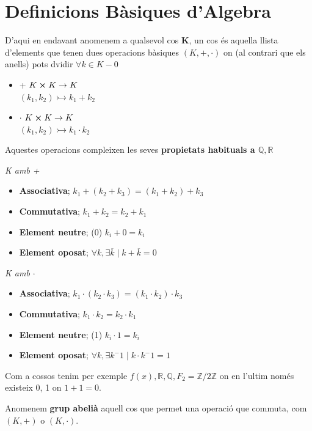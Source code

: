 \documentclass[12pt]{article}
\newcommand{\R}{\mathbb{R}}
\newcommand{\Q}{\mathbb{Q}}
\newcommand{\Z}{\mathbb{Z}}
\begin{document}
\tableofcontents

\newpage

\section{Definicions Bàsiques d'Algebra}

D'aqui en endavant anomenem a qualsevol cos \textbf{K}, un cos és aquella llista d'elements que tenen dues operacions bàsiques $(K, +, \cdot)$ on (al contrari que els anells) pots dvidir $\forall k \in K - 0$

\begin{itemize}
    \item + $K \cross K \rightarrow K$\\
    $(k_1, k_2) \rightarrowtail k_1 + k_2$
    \item $\cdot$ $K \cross K \rightarrow K$\\
    $(k_1, k_2) \rightarrowtail k_1 \cdot k_2$ 
\end{itemize}

Aquestes operacions compleixen les seves \textbf{propietats habituals a $\Q, \R$}

\textit{K amb +}
\begin{itemize}
    \item \textbf{Associativa}; $k_1 +(k_2 + k_3) = (k_1 + k_2) + k_3$
    \item \textbf{Commutativa}; $k_1 + k_2 = k_2 + k_1$
    \item \textbf{Element neutre}; (0) $k_i + 0 = k_i$
    \item \textbf{Element oposat}; $\forall k, \exists \overline{k} \mid k + \overline{k} = 0$
\end{itemize}

\textit{K amb $\cdot$}
\begin{itemize}
    \item \textbf{Associativa}; $k_1 \cdot(k_2 \cdot k_3) = (k_1 \cdot k_2) \cdot k_3$
    \item \textbf{Commutativa}; $k_1 \cdot k_2 = k_2 \cdot k_1$
    \item \textbf{Element neutre}; (1) $k_i \cdot 1 = k_i$
    \item \textbf{Element oposat}; $\forall k, \exists k^-1 \mid k \cdot k^-1 = 1$
\end{itemize}

Com a cossos tenim per exemple $f(x), \R, \Q, F_2 = \Z/2\Z$ on en l'ultim només existeix 0, 1 on $1 + 1 = 0$.

Anomenem \textbf{grup abelià} aquell cos que permet una operació que commuta, com $(K, +)$ o $(K, \cdot)$.
\end{document}
